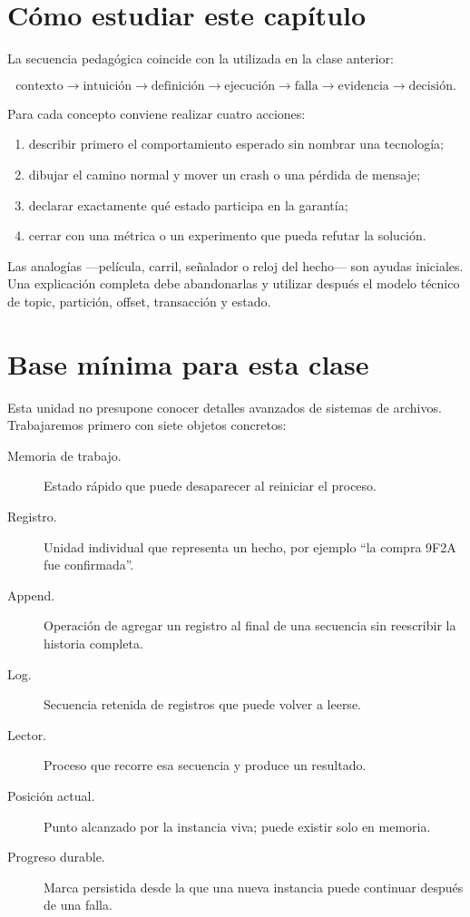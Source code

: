 \documentclass[variant=apuntes,cover=institutional,mode=screen]{ua-engineering-v6-article}
\begin{document}
\section{Cómo estudiar este capítulo}

La secuencia pedagógica coincide con la utilizada en la clase anterior:

\[
\text{contexto}
\rightarrow
\text{intuición}
\rightarrow
\text{definición}
\rightarrow
\text{ejecución}
\rightarrow
\text{falla}
\rightarrow
\text{evidencia}
\rightarrow
\text{decisión}.
\]

Para cada concepto conviene realizar cuatro acciones:

\begin{enumerate}
\item describir primero el comportamiento esperado sin nombrar una tecnología;
\item dibujar el camino normal y mover un crash o una pérdida de mensaje;
\item declarar exactamente qué estado participa en la garantía;
\item cerrar con una métrica o un experimento que pueda refutar la solución.
\end{enumerate}

\begin{uainfo}
Las analogías ---película, carril, señalador o reloj del hecho--- son ayudas iniciales. Una explicación completa debe abandonarlas y utilizar después el modelo técnico de topic, partición, offset, transacción y estado.
\end{uainfo}


\section{Base mínima para esta clase}

Esta unidad no presupone conocer detalles avanzados de sistemas de archivos. Trabajaremos primero con siete objetos concretos:

\begin{description}
\item[Memoria de trabajo.] Estado rápido que puede desaparecer al reiniciar el proceso.
\item[Registro.] Unidad individual que representa un hecho, por ejemplo ``la compra 9F2A fue confirmada''.
\item[Append.] Operación de agregar un registro al final de una secuencia sin reescribir la historia completa.
\item[Log.] Secuencia retenida de registros que puede volver a leerse.
\item[Lector.] Proceso que recorre esa secuencia y produce un resultado.
\item[Posición actual.] Punto alcanzado por la instancia viva; puede existir solo en memoria.
\item[Progreso durable.] Marca persistida desde la que una nueva instancia puede continuar después de una falla.
\end{description}
\end{document}
